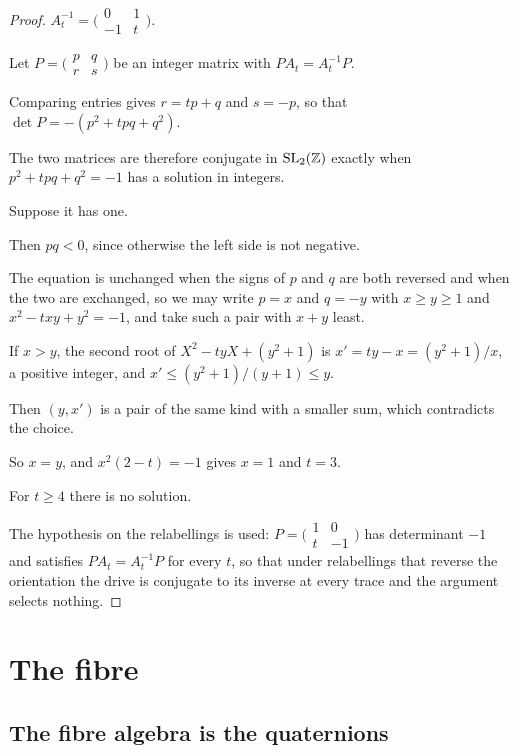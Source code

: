 \documentclass[11pt,a4paper]{article}
\theoremstyle{plain}
\theoremstyle{definition}
\theoremstyle{remark}
\begin{document}
\begin{proof}
$A_{t}^{-1}=\bigl(\begin{smallmatrix}0&1\\-1&t\end{smallmatrix}\bigr)$.

Let $P=\bigl(\begin{smallmatrix}p&q\\r&s\end{smallmatrix}\bigr)$ be an integer matrix with $PA_{t}=A_{t}^{-1}P$.

Comparing entries gives $r=tp+q$ and $s=-p$, so that $\det P=-(p^{2}+tpq+q^{2})$.

The two matrices are therefore conjugate in $\mathrm{SL}_{2}(\mathbb{Z})$ exactly when $p^{2}+tpq+q^{2}=-1$ has a solution in integers.

Suppose it has one.

Then $pq<0$, since otherwise the left side is not negative.

The equation is unchanged when the signs of $p$ and $q$ are both reversed and when the two are exchanged, so we may write $p=x$ and $q=-y$ with $x\geq y\geq1$ and $x^{2}-txy+y^{2}=-1$, and take such a pair with $x+y$ least.

If $x>y$, the second root of $X^{2}-tyX+(y^{2}+1)$ is $x'=ty-x=(y^{2}+1)/x$, a positive integer, and $x'\leq(y^{2}+1)/(y+1)\leq y$.

Then $(y,x')$ is a pair of the same kind with a smaller sum, which contradicts the choice.

So $x=y$, and $x^{2}(2-t)=-1$ gives $x=1$ and $t=3$.

For $t\geq4$ there is no solution.

The hypothesis on the relabellings is used: $P=\bigl(\begin{smallmatrix}1&0\\t&-1\end{smallmatrix}\bigr)$ has determinant $-1$ and satisfies $PA_{t}=A_{t}^{-1}P$ for every $t$, so that under relabellings that reverse the orientation the drive is conjugate to its inverse at every trace and the argument selects nothing.
\end{proof}

\section{The fibre}\label{sec:fibre}

\subsection{The fibre algebra is the quaternions}
\end{document}
